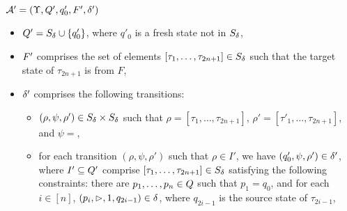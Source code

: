 $\mathcal{A}' =  (\Upsilon, Q', q'_0, F', \delta')$
\begin{itemize}
\item $Q' = S_{\delta} \cup \{q'_0\}$, where $q'_0$ is a fresh state not in $S_{\delta}$,
%
\item $F'$ comprises the set of elements $[\tau_1, \ldots, \tau_{2n+1}] \in S_{\delta}$ such that the target state of $\tau_{2n+1}$ is from $F$, 
%
\item $\delta'$ comprises the following transitions: 
%
\begin{itemize}
\item $(\rho, \psi, \rho') \in S_{\delta} \times S_{\delta}$ such that $\rho = [\tau_1, \ldots, \tau_{2n+1}]$, $\rho' = [\tau'_1, \ldots, \tau_{2n+1}]$, and $\psi = $,
%
\item for each transition $(\rho, \psi, \rho')$ such that $\rho \in I'$, we have $(q'_0, \psi, \rho') \in \delta'$, where $I' \subseteq Q'$ comprise $[\tau_1, \ldots, \tau_{2n+1}] \in S_{\delta}$ satisfying the following constraints: there are $p_1, \ldots, p_n \in Q$ such that $p_1 = q_0$, and for each $i \in [n]$, $(p_i, \vartriangleright, 1, q_{2i-1}) \in \delta$, where $q_{2i-1}$ is the source state of $\tau_{2i-1}$, 
\end{itemize}
%
\end{itemize}



